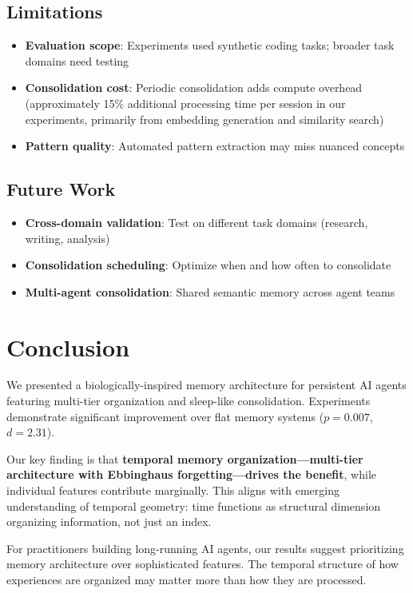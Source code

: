 \documentclass[11pt]{article}
\begin{document}
\subsection{Limitations}

\begin{itemize}
    \item \textbf{Evaluation scope}: Experiments used synthetic coding tasks; broader task domains need testing
    \item \textbf{Consolidation cost}: Periodic consolidation adds compute overhead (approximately 15\% additional processing time per session in our experiments, primarily from embedding generation and similarity search)
    \item \textbf{Pattern quality}: Automated pattern extraction may miss nuanced concepts
\end{itemize}

\subsection{Future Work}

\begin{itemize}
    \item \textbf{Cross-domain validation}: Test on different task domains (research, writing, analysis)
    \item \textbf{Consolidation scheduling}: Optimize when and how often to consolidate
    \item \textbf{Multi-agent consolidation}: Shared semantic memory across agent teams
\end{itemize}

\section{Conclusion}

We presented a biologically-inspired memory architecture for persistent AI agents featuring multi-tier organization and sleep-like consolidation. Experiments demonstrate significant improvement over flat memory systems ($p=0.007$, $d=2.31$).

Our key finding is that \textbf{temporal memory organization---multi-tier architecture with Ebbinghaus forgetting---drives the benefit}, while individual features contribute marginally. This aligns with emerging understanding of temporal geometry: time functions as structural dimension organizing information, not just an index.

For practitioners building long-running AI agents, our results suggest prioritizing memory architecture over sophisticated features. The temporal structure of how experiences are organized may matter more than how they are processed.
\end{document}
